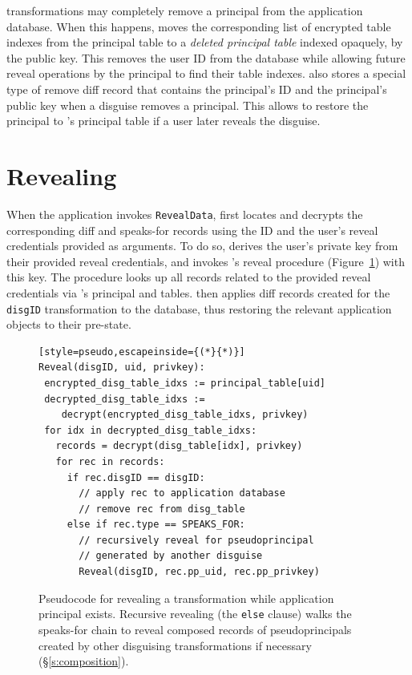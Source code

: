 %
\Xxing transformations may completely remove a principal from the
application database.
%
When this happens, \sys moves the corresponding list of encrypted \xx table
indexes from the principal table to a \emph{deleted principal table} indexed
opaquely, \eg by the public key.
%
This removes the user ID from the database while allowing future reveal
operations by the principal to find their \xx table indexes.
%
\sys also stores a special type of remove diff record that contains the
principal's ID and the principal's public key when a disguise removes a principal.  This
allows \sys to restore the principal to \sys's principal table if a user later
reveals the disguise.
%

\section{Revealing}
\label{s:reveal}

%
When the application invokes \texttt{RevealData}, \sys first locates and
decrypts the corresponding diff and speaks-for records using the \xx ID and the
user’s reveal credentials provided as arguments.
%
To do so, \sys derives the user's private key from their provided reveal
credentials, and invokes \sys's reveal procedure (Figure~\ref{f:revealpseudo})
with this key. The procedure looks up all \xx records related to the provided
reveal credentials via \sys's principal and \xx tables.
%
\sys then applies diff records created for the \verb+disgID+ \xx transformation
to the database, thus restoring the relevant application objects to their
pre-\xxed state.

\begin{figure}[t]
  \small
\begin{lstlisting}[style=pseudo,escapeinside={(*}{*)}]
Reveal(disgID, uid, privkey):
 encrypted_disg_table_idxs := principal_table[uid]
 decrypted_disg_table_idxs :=
    decrypt(encrypted_disg_table_idxs, privkey)
 for idx in decrypted_disg_table_idxs:
   records = decrypt(disg_table[idx], privkey)
   for rec in records:
     if rec.disgID == disgID:
       // apply rec to application database
       // remove rec from disg_table
     else if rec.type == SPEAKS_FOR:
       // recursively reveal for pseudoprincipal
       // generated by another disguise
       Reveal(disgID, rec.pp_uid, rec.pp_privkey)
\end{lstlisting}
    \caption[Revealing restores all
    reachable disguised data using the user's reveal credentials.]{Pseudocode for revealing a \xxing transformation while
    application principal  exists. Recursive revealing (the
    \texttt{\small else} clause) walks the speaks-for chain to reveal composed
    records of pseudoprincipals created by other disguising transformations
    if necessary (\S\ref{s:composition}).}
  \label{f:revealpseudo}
\end{figure}

